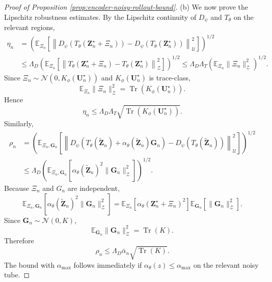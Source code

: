 \documentclass[11pt]{article}
\begin{document}
\begin{proof}[Proof of Proposition \ref{prop:encoder-noisy-rollout-bound}]
\item (b) We now prove the Lipschitz robustness estimates. By the Lipschitz continuity of $D_\psi$ and $T_\theta$ on the relevant regions,
\[
\begin{aligned}
\eta_n &=\left(\mathbb E_{\Xi_n}
\left[\left\|D_\psi(T_\theta(\mathbf Z_n^\star+\Xi_n))-D_\psi(T_\theta(\mathbf Z_n^\star))
\right\|_{\mathcal U}^2\right]\right)^{1/2} \\
&\le\Lambda_D\left(\mathbb E_{\Xi_n}\left[\left\|
T_\theta(\mathbf Z_n^\star+\Xi_n)-T_\theta(\mathbf Z_n^\star)
\right\|_{\mathcal Z}^2\right]\right)^{1/2}\le\Lambda_D\Lambda_T
\left(\mathbb E_{\Xi_n}\|\Xi_n\|_{\mathcal Z}^2\right)^{1/2}.
\end{aligned}
\]
Since $\Xi_n\sim\mathcal N(0,K_\phi(\mathbf U_n^\star))$ and $K_\phi(\mathbf U_n^\star)$ is trace-class,
\[
\mathbb E_{\Xi_n}\|\Xi_n\|_{\mathcal Z}^2=\operatorname{Tr}(K_\phi(\mathbf U_n^\star)).
\]
Hence
\[
\eta_n\le\Lambda_D\Lambda_T\sqrt{\operatorname{Tr}(K_\phi(\mathbf U_n^\star))}.
\]
Similarly,
\[
\begin{aligned}
\rho_n&=\left(\mathbb E_{\Xi_n,\mathbf G_n}
\left[\left\|D_\psi\left(T_\theta(\widetilde{\mathbf Z}_n)+\alpha_\theta(\widetilde{\mathbf Z}_n)\mathbf G_n\right)-D_\psi(T_\theta(\widetilde{\mathbf Z}_n))
\right\|_{\mathcal U}^2\right]\right)^{1/2} \\
&\le\Lambda_D\left(\mathbb E_{\Xi_n,\mathbf G_n}\left[\alpha_\theta(\widetilde{\mathbf Z}_n)^2\|\mathbf G_n\|_{\mathcal Z}^2\right]\right)^{1/2}.
\end{aligned}
\]
Because $\Xi_n$ and $G_n$ are independent,
\[
\mathbb E_{\Xi_n,\mathbf G_n}
\left[\alpha_\theta(\widetilde{\mathbf Z}_n)^2
\|\mathbf G_n\|_{\mathcal Z}^2\right]=\mathbb E_{\Xi_n}\left[\alpha_\theta(\mathbf Z_n^\star+\Xi_n)^2\right]\mathbb E_{\mathbf G_n}\left[\|\mathbf G_n\|_{\mathcal Z}^2\right].
\]
Since $\mathbf G_n\sim\mathcal N(0,K)$,
\[
\mathbb E_{\mathbf G_n}\|\mathbf G_n\|_{\mathcal Z}^2=\operatorname{Tr}(K).
\]
Therefore
\[
\rho_n\le\Lambda_D\bar\alpha_n\sqrt{\operatorname{Tr}(K)}.
\]
The bound with $\alpha_{\max}$ follows immediately if
$\alpha_\theta(z)\le\alpha_{\max}$ on the relevant noisy tube.


\end{proof}
\end{document}
